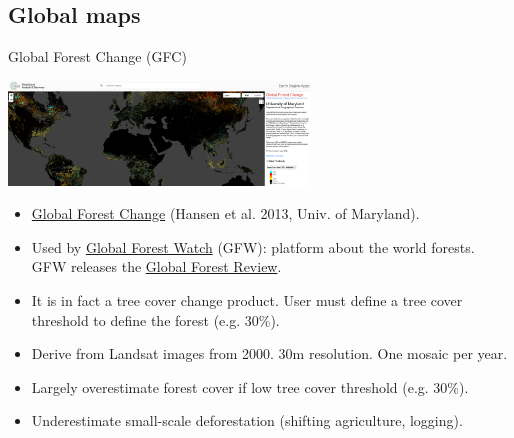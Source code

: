 \documentclass[10pt,table,dvipsnames,compress]{beamer}
\begin{document}
\subsection{Global maps}
\label{sec:orga51ffc0}

\begin{frame}[label={sec:orge595ab1}]{Global Forest Change (GFC)}
\begin{center}
\includegraphics[width=8cm]{figs/fcc/gfc.png}
\end{center}

\begin{itemize}
\item \href{https://glad.earthengine.app/view/global-forest-change}{Global Forest Change} (Hansen et al. 2013, Univ. of Maryland).
\item Used by \href{https://www.globalforestwatch.org/}{Global Forest Watch} (GFW): platform about the world forests. GFW releases the \href{https://research.wri.org/gfr/global-forest-review}{Global Forest Review}.
\item It is in fact a tree cover change product. User must define a tree cover threshold to define the forest (e.g. 30\%).
\item Derive from Landsat images from 2000. 30m resolution. One mosaic per year.
\item Largely overestimate forest cover if low tree cover threshold (e.g. 30\%).
\item Underestimate small-scale deforestation (shifting agriculture, logging).
\end{itemize}
\end{frame}
\end{document}
